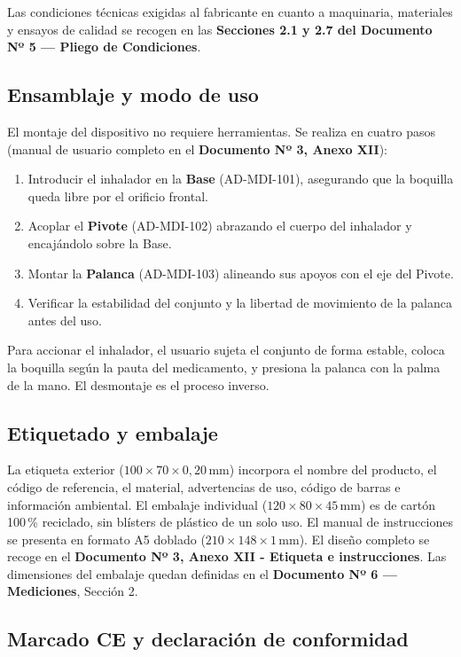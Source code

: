 \documentclass[11pt,a4paper]{article}
\begin{document}
Las condiciones técnicas exigidas al fabricante en cuanto a maquinaria, materiales y ensayos de calidad se recogen en las \textbf{Secciones 2.1 y 2.7 del Documento Nº 5 — Pliego de Condiciones}.

\subsection{Ensamblaje y modo de uso}

El montaje del dispositivo no requiere herramientas. Se realiza en cuatro pasos (manual de usuario completo en el \textbf{Documento Nº 3, Anexo XII}):

\begin{enumerate}
    \item Introducir el inhalador en la \textbf{Base} (AD-MDI-101), asegurando que la boquilla queda libre por el orificio frontal.
    \item Acoplar el \textbf{Pivote} (AD-MDI-102) abrazando el cuerpo del inhalador y encajándolo sobre la Base.
    \item Montar la \textbf{Palanca} (AD-MDI-103) alineando sus apoyos con el eje del Pivote.
    \item Verificar la estabilidad del conjunto y la libertad de movimiento de la palanca antes del uso.
\end{enumerate}

Para accionar el inhalador, el usuario sujeta el conjunto de forma estable, coloca la boquilla según la pauta del medicamento, y presiona la palanca con la palma de la mano. El desmontaje es el proceso inverso.

\subsection{Etiquetado y embalaje}

La etiqueta exterior ($100 \times 70 \times 0{,}20\,\text{mm}$) incorpora el nombre del producto, el código de referencia, el material, advertencias de uso, código de barras e información ambiental. El embalaje individual ($120 \times 80 \times 45\,\text{mm}$) es de cartón 100\,\% reciclado, sin blísters de plástico de un solo uso. El manual de instrucciones se presenta en formato A5 doblado ($210 \times 148 \times 1\,\text{mm}$). El diseño completo se recoge en el \textbf{Documento Nº 3, Anexo XII - Etiqueta e instrucciones}. Las dimensiones del embalaje quedan definidas en el \textbf{Documento Nº 6 — Mediciones}, Sección 2.

\subsection{Marcado CE y declaración de conformidad}
\end{document}
